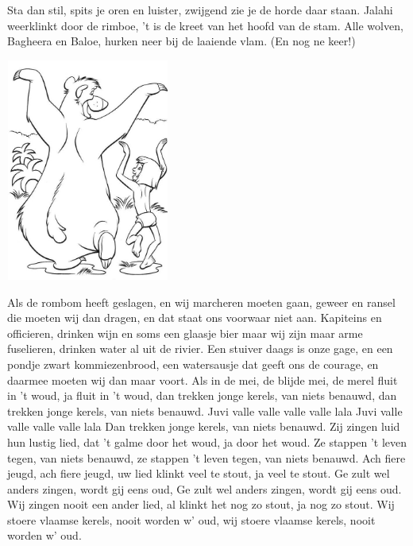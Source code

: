 \documentclass{article}
\begin{document}
\begin{songs}{}
Sta dan stil, spits je oren en luister, zwijgend zie je de horde daar staan. 
\endverse
\beginchorus
Jalahi weerklinkt door de rimboe, 't is de kreet van het hoofd van de stam.
Alle wolven, Bagheera en Baloe, hurken neer bij de laaiende vlam. 
(En nog ne keer!)
\endchorus
\endsong
\begin{intersong}
    \includegraphics[width=0.4\textwidth]{img3}
\end{intersong}
\beginverse
Als de rombom heeft geslagen, en wij marcheren moeten gaan, geweer en ransel die moeten wij dan dragen, en dat staat ons voorwaar niet aan. 
\endverse
\beginchorus
Kapiteins en officieren, drinken wijn en soms een glaasje bier maar wij zijn maar arme fuselieren, drinken water al uit de rivier.
\endchorus
\beginverse
Een stuiver daags is onze gage, en een pondje zwart kommiezenbrood, een watersausje dat geeft ons de courage, en daarmee moeten wij dan maar voort.
\endverse
\endsong
{}
\beginverse
Als in de mei, de blijde mei,
de merel fluit in 't woud,
ja fluit in 't woud,
dan trekken jonge kerels, 
van niets benauwd,
dan trekken jonge kerels, 
van niets benauwd.
\endverse
\beginchorus
Juvi valle valle valle valle lala
Juvi valle valle valle valle lala
Dan trekken jonge kerels, 
van niets benauwd.
\endchorus
\beginverse
Zij zingen luid hun lustig lied,
dat 't galme door het woud, 
ja door het woud.
Ze stappen 't leven tegen, 
van niets benauwd,
ze stappen 't leven tegen, 
van niets benauwd.
\endverse
\beginverse
Ach fiere jeugd, ach fiere jeugd,
uw lied klinkt veel te stout, 
ja veel te stout.
Ge zult wel anders zingen,
wordt gij eens oud,
Ge zult wel anders zingen,
wordt gij eens oud.
\endverse
\beginverse
Wij zingen nooit een ander lied,
al klinkt het nog zo stout,
ja nog zo stout.
Wij stoere vlaamse kerels, 
nooit worden w' oud,
wij stoere vlaamse kerels, 
nooit worden w' oud.

\end{songs}
\end{document}
